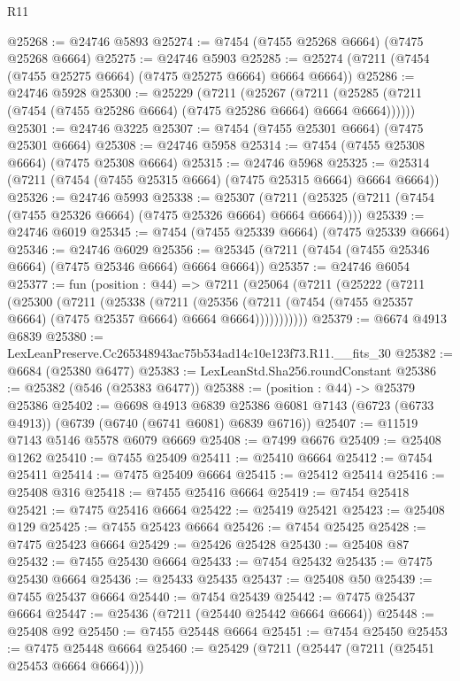 \begin{lexlean}{R11}
\begin{coremodule}
@25268 := @24746 @5893
@25274 := @7454 (@7455 @25268 @6664) (@7475 @25268 @6664)
@25275 := @24746 @5903
@25285 := @25274 (@7211 (@7454 (@7455 @25275 @6664) (@7475 @25275 @6664) @6664 @6664))
@25286 := @24746 @5928
@25300 := @25229
    (@7211
      (@25267
        (@7211 (@25285 (@7211 (@7454 (@7455 @25286 @6664) (@7475 @25286 @6664) @6664 @6664))))))
@25301 := @24746 @3225
@25307 := @7454 (@7455 @25301 @6664) (@7475 @25301 @6664)
@25308 := @24746 @5958
@25314 := @7454 (@7455 @25308 @6664) (@7475 @25308 @6664)
@25315 := @24746 @5968
@25325 := @25314 (@7211 (@7454 (@7455 @25315 @6664) (@7475 @25315 @6664) @6664 @6664))
@25326 := @24746 @5993
@25338 := @25307
    (@7211 (@25325 (@7211 (@7454 (@7455 @25326 @6664) (@7475 @25326 @6664) @6664 @6664))))
@25339 := @24746 @6019
@25345 := @7454 (@7455 @25339 @6664) (@7475 @25339 @6664)
@25346 := @24746 @6029
@25356 := @25345 (@7211 (@7454 (@7455 @25346 @6664) (@7475 @25346 @6664) @6664 @6664))
@25357 := @24746 @6054
@25377 := fun (position : @44) =>
  @7211
    (@25064
      (@7211
        (@25222
          (@7211
            (@25300
              (@7211
                (@25338
                  (@7211
                    (@25356
                      (@7211 (@7454 (@7455 @25357 @6664) (@7475 @25357 @6664) @6664 @6664)))))))))))
@25379 := @6674 @4913 @6839
@25380 := LexLeanPreserve.Cc265348943ac75b534ad14c10e123f73.R11.__fits_30
@25382 := @6684 (@25380 @6477)
@25383 := LexLeanStd.Sha256.roundConstant
@25386 := @25382 (@546 (@25383 @6477))
@25388 := (position : @44) -> @25379 @25386
@25402 := @6698
    @4913
    @6839
    @25386
    @6081
    @7143
    (@6723 (@6733 @4913))
    (@6739 (@6740 (@6741 @6081) @6839 @6716))
@25407 := @11519 @7143 @5146 @5578 @6079 @6669
@25408 := @7499 @6676
@25409 := @25408 @1262
@25410 := @7455 @25409
@25411 := @25410 @6664
@25412 := @7454 @25411
@25414 := @7475 @25409 @6664
@25415 := @25412 @25414
@25416 := @25408 @316
@25418 := @7455 @25416 @6664
@25419 := @7454 @25418
@25421 := @7475 @25416 @6664
@25422 := @25419 @25421
@25423 := @25408 @129
@25425 := @7455 @25423 @6664
@25426 := @7454 @25425
@25428 := @7475 @25423 @6664
@25429 := @25426 @25428
@25430 := @25408 @87
@25432 := @7455 @25430 @6664
@25433 := @7454 @25432
@25435 := @7475 @25430 @6664
@25436 := @25433 @25435
@25437 := @25408 @50
@25439 := @7455 @25437 @6664
@25440 := @7454 @25439
@25442 := @7475 @25437 @6664
@25447 := @25436 (@7211 (@25440 @25442 @6664 @6664))
@25448 := @25408 @92
@25450 := @7455 @25448 @6664
@25451 := @7454 @25450
@25453 := @7475 @25448 @6664
@25460 := @25429 (@7211 (@25447 (@7211 (@25451 @25453 @6664 @6664))))

\end{coremodule}
\end{lexlean}

